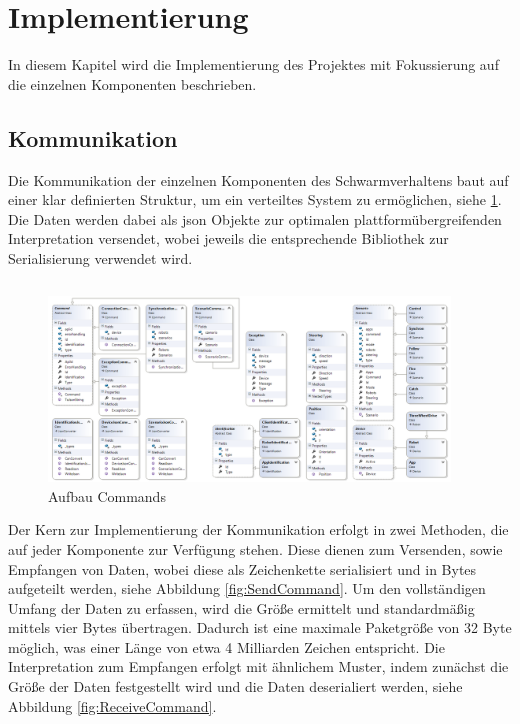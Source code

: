 \section{Implementierung}

In diesem Kapitel wird die Implementierung des Projektes mit Fokussierung auf die einzelnen Komponenten beschrieben.

\subsection{Kommunikation}

Die Kommunikation der einzelnen Komponenten des Schwarmverhaltens baut auf einer klar definierten Struktur, um ein verteiltes System zu ermöglichen, siehe \ref{fig:full_classdiagram}. Die Daten werden dabei als \gls{json} Objekte zur optimalen plattformübergreifenden Interpretation versendet, wobei jeweils die entsprechende Bibliothek zur Serialisierung verwendet wird.
\begin{verbatim}
\end{verbatim}
\begin{figure}[h]
	\begin{center}
		\includegraphics[width=0.95\textwidth]{images/uml/full_class_diagram.png}
	\end{center}
	\caption{Aufbau Commands}
	\label{fig:full_classdiagram}
\end{figure}

\newpage
\noindent
Der Kern zur Implementierung der Kommunikation erfolgt in zwei Methoden, die auf jeder Komponente zur Verfügung stehen. Diese dienen zum Versenden, sowie Empfangen von Daten, wobei diese als Zeichenkette serialisiert und in Bytes aufgeteilt werden, siehe Abbildung \ref{fig:SendCommand}. Um den vollständigen Umfang der Daten zu erfassen, wird die Größe ermittelt und standardmäßig mittels vier Bytes übertragen. Dadurch ist eine maximale Paketgröße von 32 Byte möglich, was einer Länge von etwa 4 Milliarden Zeichen entspricht. Die Interpretation zum Empfangen erfolgt mit ähnlichem Muster, indem zunächst die Größe der Daten festgestellt wird und die Daten deserialiert werden, siehe Abbildung \ref{fig:ReceiveCommand}.

